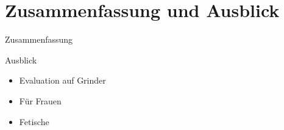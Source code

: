 \chapter{Zusammenfassung und Ausblick}
\label{summary}


Zusammenfassung


Ausblick
\begin{itemize}
    \item Evaluation auf Grinder
    \item Für Frauen
    \item Fetische
\end{itemize}